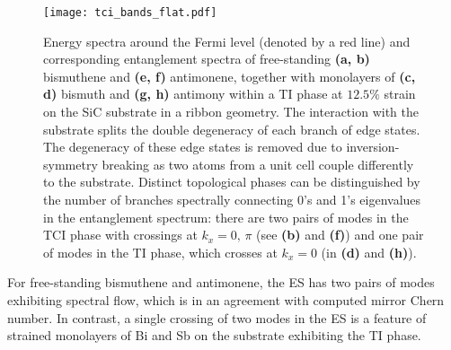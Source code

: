 \begin{figure}[H]
\centering
\texttt{[image: tci\_bands\_flat.pdf]}
\caption[Comparison of energy and entanglement spectra of the systems in TI and TCI insulating phases]{Energy spectra around the Fermi level (denoted by a red line) and corresponding entanglement spectra of free-standing \textbf{(a, b)} bismuthene  and  \textbf{(e, f)} antimonene, together with monolayers of \textbf{(c, d)} bismuth and \textbf{(g, h)} antimony within a TI phase at $12.5 \%$ strain on the SiC substrate in a ribbon geometry. The interaction with the substrate splits the double degeneracy of each branch of edge states. The degeneracy of these edge states is removed due to inversion-symmetry breaking as two atoms from a unit cell couple differently to the substrate. Distinct topological phases can be distinguished by the number of branches spectrally connecting 0’s and 1’s eigenvalues in the entanglement spectrum: there are two pairs of modes in the TCI phase with crossings at $k_x = 0, \, \pi$ (see \textbf{(b)} and \textbf{(f)}) and one pair of modes in the TI phase, which crosses at $k_x = 0$ (in \textbf{(d)} and \textbf{(h)}).}
\label{fig:free-substrate-bisb}
\end{figure}

For free-standing bismuthene and antimonene, the ES has two pairs of modes exhibiting spectral flow, which is in an agreement with computed mirror Chern number. In contrast, a single crossing of two modes in the ES is a feature of strained monolayers of Bi and Sb on the substrate exhibiting the TI phase.